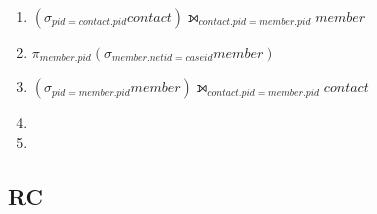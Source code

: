 \documentclass{article}
\begin{document}
\begin{enumerate}
\item $\left(\sigma_{pid=contact.pid} contact \right) \leftouterjoin_{contact.pid=member.pid} member$  
\item $\pi_{member.pid}\left(\sigma_{member.netid=caseid} member\right)$
\item $\left(\sigma_{pid=member.pid} member \right) \leftouterjoin_{contact.pid=member.pid} contact$
\item 
\item
\end{enumerate}

\subsection{RC}
\end{document}

